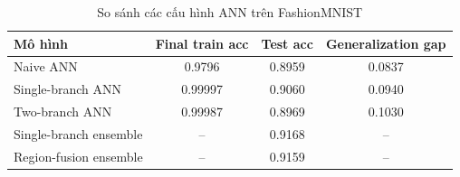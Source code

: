\begin{table}[H]
\centering
\caption{So sánh các cấu hình ANN trên FashionMNIST}
\label{tab:fashion-mnist-model-comparison}
\begin{tabular}{l c c c}
\toprule
Mô hình & Final train acc & Test acc & Generalization gap \\
\midrule
Naive ANN & 0.9796 & 0.8959 & 0.0837 \\
Single-branch ANN & 0.99997 & 0.9060 & 0.0940 \\
Two-branch ANN & 0.99987 & 0.8969 & 0.1030 \\
Single-branch ensemble & -- & 0.9168 & -- \\
Region-fusion ensemble & -- & 0.9159 & -- \\
\bottomrule
\end{tabular}
\end{table}
